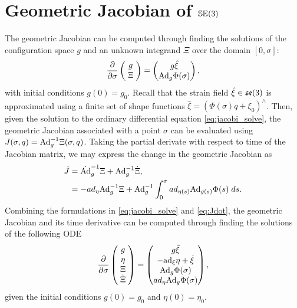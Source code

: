 \section{Geometric Jacobian of ${\mathbb{SE}(3)}$}
The geometric Jacobian can be computed through finding the solutions of the configuration space $g$ and an unknown integrand $\Xi$ over the domain $[0,\sigma]$:
\begin{equation}
\dfrac{\partial }{\partial \sigma} \begin{pmatrix} 
\;g\;\\ \;\Xi\;
\end{pmatrix} = 
\begin{pmatrix} 
g \hat{\xi} \\
\textnormal{Ad}_{g} \Phi(\sigma)
\end{pmatrix},
\label{eq:jacobi_solve}
\end{equation}
with initial conditions $g(0) = g_0$. Recall that the strain field $\hat{\xi} \in {\mathfrak{se}(3)}$ is approximated using a finite set of shape functions $\hat{\xi} = (\Phi(\sigma)q + \xi_0)^\wedge$. Then, given the solution to the ordinary differential equation \eqref{eq:jacobi_solve}, the geometric Jacobian associated with a point $\sigma$ can be evaluated using $J(\sigma,q) = \textnormal{Ad}_g^{-1} \Xi(\sigma,q)$.
Taking the partial derivate with respect to time of the Jacobian matrix, we may express the change in the geometric Jacobian as
\begin{align}
\dot{J} & = \dot{\textnormal{Ad}}_g^{-1} \Xi + {\textnormal{Ad}}_g^{-1} \dot{\Xi}, \notag \\
& = -ad_{\eta} {\textnormal{Ad}}_g^{-1} \Xi + {\textnormal{Ad}}_g^{-1} \int_0^\sigma ad_{\eta(s)} {\textnormal{Ad}}_{g(s)} \Phi(s) \; ds \label{eq:Jdot}. 
\end{align}
Combining the formulations in \eqref{eq:jacobi_solve} and \eqref{eq:Jdot}, the geometric Jacobian and its time derivative can be computed through finding the solutions of the following ODE
\begin{equation}
\dfrac{\partial }{\partial \sigma} \begin{pmatrix} 
\;g\;\\ \;\eta\; \\ \;\Xi\; \\ \;\dot{\Xi}\;
\end{pmatrix} = 
\begin{pmatrix} 
g \hat{\xi} \\
-\textnormal{ad}_{\xi} \eta + \dot{\xi} \\
\textnormal{Ad}_{g} \Phi(\sigma) \\
ad_{\eta} {\textnormal{Ad}}_{g} \Phi(\sigma)
\end{pmatrix},
\label{eq:full_jacobi_solve}
\end{equation}
given the initial conditions $g(0) = g_0$ and $\eta(0) = \eta_0$. 